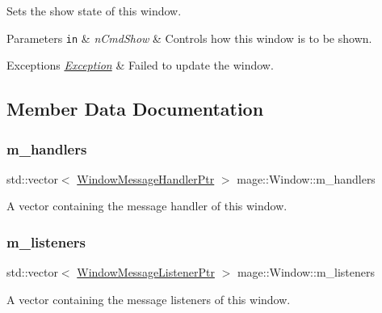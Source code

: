 Sets the show state of this window.


\begin{DoxyParams}[1]{Parameters}
\mbox{\tt in}  & {\em n\+Cmd\+Show} & Controls how this window is to be shown. \\
\hline
\end{DoxyParams}

\begin{DoxyExceptions}{Exceptions}
{\em \hyperlink{classmage_1_1_exception}{Exception}} & Failed to update the window. \\
\hline
\end{DoxyExceptions}


\subsection{Member Data Documentation}
\hypertarget{classmage_1_1_window_a7438964a7b8c196d84da24cf789e5bd9}{}\label{classmage_1_1_window_a7438964a7b8c196d84da24cf789e5bd9} 
\subsubsection{\texorpdfstring{m\+\_\+handlers}{m\_handlers}}
{\footnotesize\ttfamily std\+::vector$<$ \hyperlink{classmage_1_1_window_add1d792fb9f71e70d4fb07409d80cfdd}{Window\+Message\+Handler\+Ptr} $>$ mage\+::\+Window\+::m\+\_\+handlers\hspace{0.3cm}{\ttfamily [private]}}

A vector containing the message handler of this window. \hypertarget{classmage_1_1_window_a28aab68439dc39058a7e507b0cd8c60b}{}\label{classmage_1_1_window_a28aab68439dc39058a7e507b0cd8c60b} 
\subsubsection{\texorpdfstring{m\+\_\+listeners}{m\_listeners}}
{\footnotesize\ttfamily std\+::vector$<$ \hyperlink{classmage_1_1_window_a0e0a4f2a3f6db176f6aec454b94a06fb}{Window\+Message\+Listener\+Ptr} $>$ mage\+::\+Window\+::m\+\_\+listeners\hspace{0.3cm}{\ttfamily [private]}}

A vector containing the message listeners of this window. \hypertarget{classmage_1_1_window_a5ca72a18801ff9e6abc309949d7b08b4}{}\label{classmage_1_1_window_a5ca72a18801ff9e6abc309949d7b08b4} 
